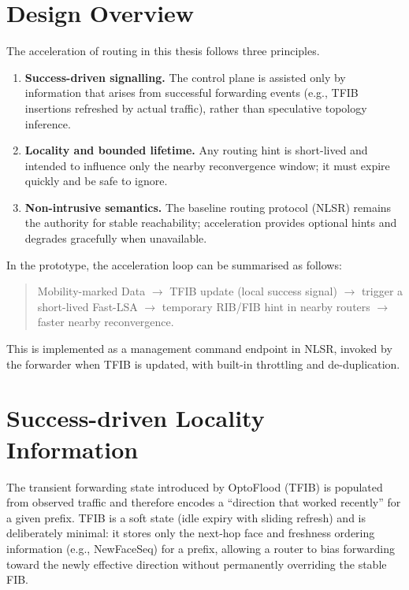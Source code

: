 \section{Design Overview}
\label{sec:routingacc:overview}

The acceleration of routing in this thesis follows three principles.

\begin{enumerate}
  \item \textbf{Success-driven signalling.} The control plane is assisted only by information that arises from successful forwarding events (e.g., TFIB insertions refreshed by actual traffic), rather than speculative topology inference.
  \item \textbf{Locality and bounded lifetime.} Any routing hint is short-lived and intended to influence only the nearby reconvergence window; it must expire quickly and be safe to ignore.
  \item \textbf{Non-intrusive semantics.} The baseline routing protocol (NLSR) remains the authority for stable reachability; acceleration provides optional hints and degrades gracefully when unavailable.
\end{enumerate}

In the prototype, the acceleration loop can be summarised as follows:

\begin{quote}
Mobility-marked Data $\rightarrow$ TFIB update (local success signal) $\rightarrow$ trigger a short-lived Fast-LSA $\rightarrow$ temporary RIB/FIB hint in nearby routers $\rightarrow$ faster nearby reconvergence.
\end{quote}

This is implemented as a management command endpoint in NLSR, invoked by the forwarder
when TFIB is updated, with built-in throttling and de-duplication.

\section{Success-driven Locality Information}
\label{sec:routingacc:locality}

The transient forwarding state introduced by OptoFlood (TFIB) is populated from observed traffic and therefore encodes a “direction that worked recently” for a given prefix. TFIB is a soft state (idle expiry with sliding refresh) and is deliberately minimal: it stores only the next-hop face and freshness ordering information (e.g., NewFaceSeq) for a prefix, allowing a router to bias forwarding toward the newly effective direction without permanently overriding the stable FIB.

